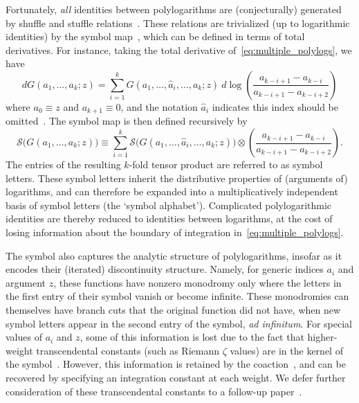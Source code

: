 \documentclass[11pt]{article}
\begin{document}
Fortunately, \emph{all} identities between polylogarithms are (conjecturally) generated by shuffle and stuffle relations~\cite{2011arXiv1102.1312B,2015arXiv151206409B}. These relations are trivialized (up to logarithmic identities) by the symbol map~\cite{}, which can be defined in terms of total derivatives. For instance, taking the total derivative of~\eqref{eq:multiple_polylogs}, we have
\begin{equation} \label{eq:symbol_def}
d G(a_1, \dots, a_k; z) = \sum_{i=1}^{k} G(a_1,\dots,\hat{a}_i,\dots,a_k; z)\ d\log \left( \frac{a_{k-i+1} - a_{k-i}}{a_{k-i+1} - a_{k-i+2}} \right)
\end{equation} 
where $a_0 \equiv z$ and $a_{k+1} \equiv 0$, and the notation $\hat{a}_i$ indicates this index should be omitted~\cite{GoncharovMixedTate}. The symbol map is then defined recursively by
\begin{equation} \label{eq:symbol_def}
\mathcal{S}\big(G(a_1, \dots, a_k; z)\big) \equiv \sum_{i=1}^{k} \mathcal{S}\big(G(a_1,\dots,\hat{a}_i,\dots,a_k; z) \big) \otimes \left( \frac{a_{k-i+1} - a_{k-i}}{a_{k-i+1} - a_{k-i+2}} \right).
\end{equation} 
The entries of the resulting $k$-fold tensor product are referred to as symbol letters. These symbol letters inherit the distributive properties of (arguments of) logarithms, and can therefore be expanded into a multiplicatively independent basis of symbol letters (the `symbol alphabet'). Complicated polylogarithmic identities are thereby reduced to identities between logarithms, at the cost of losing information about the boundary of integration in~\eqref{eq:multiple_polylogs}.
 
The symbol also captures the analytic structure of polylogarithms, insofar as it encodes their (iterated) discontinuity structure. Namely, for generic indices $a_i$ and argument $z$, these functions have nonzero monodromy only where the letters in the first entry of their symbol vanish or become infinite. These monodromies can themselves have branch cuts that the original function did not have, when new symbol letters appear in the second entry of the symbol, \emph{ad infinitum}. For special values of $a_i$ and $z$, some of this information is lost due to the fact that higher-weight transcendental constants (such as Riemann $\zeta$ values) are in the kernel of the symbol~\cite{Gonch}. However, this information is retained by the coaction~\cite{Brown:2011ik}, and can be recovered by specifying an integration constant at each weight. We defer further consideration of these transcendental constants to a follow-up paper~\cite{}.
\end{document}
